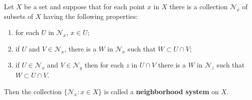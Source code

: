 Let $X$ be a set and suppose that for each point $x$ in $X$ there is a collection $\mathcal{N}_x$ of subsets of $X$ having the following properties:

\begin{enumerate}
\item[(a)] for each $U$ in $\mathcal{N}_x$, $x \in U$;
\item[(b)] if $U$ and $V \in \mathcal{N}_x$, there is a $W$ in $\mathcal{N}_x$ such that $W \subset U \cap V$;
\item[(c)] if $U \in \mathcal{N}_x$ and $V \in \mathcal{N}_y$ then for each $z$ in $U \cap V$ there is a $W$ in $\mathcal{N}_z$ such that $W \subset U \cap V$.
\end{enumerate}

Then the collection $\{\mathcal{N}_x : x \in X\}$ is called a \textbf{neighborhood system} on $X$.
